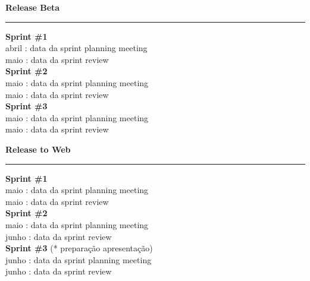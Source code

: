\begin{minipage}{\linewidth}
\noindent \textbf{Release Beta}\\[1mm]
\noindent \rule{\linewidth}{0.4pt}
\noindent \textbf{Sprint \#1}\\[1mm]
 abril : data da sprint planning meeting\\[1mm]
 maio : data da sprint review\\[3mm]
\noindent \textbf{Sprint \#2}\\[1mm]
 maio : data da sprint planning meeting\\[1mm]
 maio : data da sprint review\\[3mm]
\noindent \textbf{Sprint \#3}\\[1mm]
 maio : data da sprint planning meeting\\[1mm]
 maio : data da sprint review\\[4mm]
\end{minipage}

\begin{minipage}{\linewidth}
\noindent \textbf{Release to Web}\\[1mm]
\noindent \rule{\linewidth}{0.4pt}
\noindent \textbf{Sprint \#1}\\[1mm]
 maio : data da sprint planning meeting\\[1mm]
 maio : data da sprint review\\[3mm]
\noindent \textbf{Sprint \#2}\\[1mm]
 maio : data da sprint planning meeting\\[1mm]
 junho : data da sprint review\\[3mm]
\noindent \textbf{Sprint \#3} (* preparação apresentação)\\[1mm]
 junho : data da sprint planning meeting\\[1mm]
 junho : data da sprint review\\[4mm]
\end{minipage}


